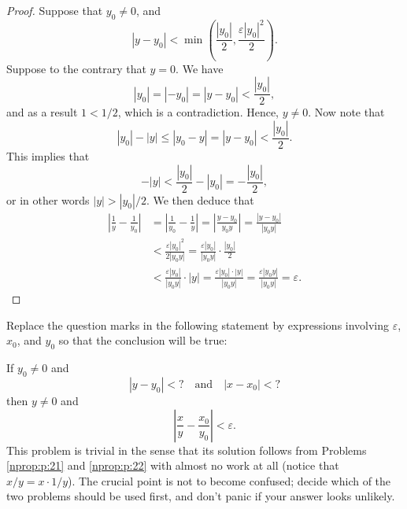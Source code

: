 \begin{proof}
	Suppose that $y_0 \neq 0$, and
	$$
		|y - y_0| < \min \left( \frac{|y_0|}{2}, \frac{\varepsilon |y_0|^{2}}{2} \right).
	$$
	Suppose to the contrary that $y = 0$. We have
	$$
		|y_0| = |-y_0| = |y - y_0| < \frac{|y_0|}{2},
	$$
	and as a result $1 < 1/2$, which is a contradiction. Hence, $y \neq 0$. Now note that
	$$
		|y_0| - |y| \leq |y_0 - y| = |y - y_0| < \frac{|y_0|}{2}.
	$$
	This implies that
	$$
		-|y| < \frac{|y_0|}{2} - |y_0| = -\frac{|y_0|}{2},
	$$
	or in other words $|y| > |y_0|/2$. We then deduce that
	\begin{align*}
		\left| \frac{1}{y} - \frac{1}{y_0} \right| & = \left| \frac{1}{y_0} - \frac{1}{y} \right| = \left| \frac{y - y_0}{y_0 y} \right| = \frac{|y - y_0|}{|y_0 y|}                                  \\
		                                           & < \frac{\varepsilon |y_0|^2}{2 |y_0 y|} = \frac{\varepsilon |y_0|}{|y_0 y|} \cdot \frac{|y_0|}{2}                                                \\
		                                           & < \frac{\varepsilon |y_0|}{|y_0 y|} \cdot |y| = \frac{\varepsilon |y_0| \cdot |y|}{|y_0 y|} = \frac{\varepsilon |y_0 y|}{|y_0 y|} = \varepsilon.
	\end{align*}

\end{proof}


\Newpage
\begin{problem} %
	Replace the question marks in the following statement by expressions involving $\varepsilon$, $x_0$, and $y_0$ so that the conclusion will be true:

	\vspace{0.5em}
	\noindent If $y_0 \neq 0$ and
	$$
		|y - y_0| < \text{?} \quad \text{and} \quad |x - x_0| < \text{?}
	$$
	then $y \neq 0$ and
	$$
		\left| \frac{x}{y} - \frac{x_0}{y_0} \right| < \varepsilon.
	$$
	This problem is trivial in the sense that its solution follows from Problems \ref{nprop:p:21} and \ref{nprop:p:22} with almost no work at all (notice that $x / y = x \cdot 1 / y$). The crucial point is not to become confused; decide which of the two problems should be used first, and don't panic if your answer looks unlikely.
\end{problem}

